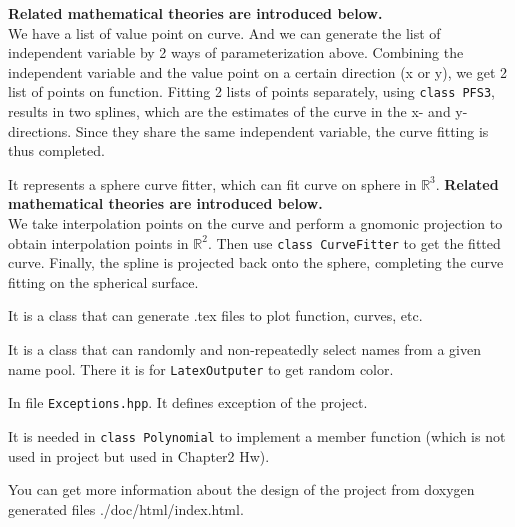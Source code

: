 \documentclass[a4paper]{article}
\begin{document}
\begin{description}
  \textbf{Related mathematical theories are introduced below.}\\
  We have a list of value point on curve. And we can generate the list of independent variable by 2 ways of parameterization above.
  Combining the independent variable and the value point on a certain direction (x or y), we get 2 list of points on function.
  Fitting 2 lists of points separately, using \texttt{class PFS3}, results in two splines, which are the estimates of the curve in the x- and y-directions. 
  Since they share the same independent variable, the curve fitting is thus completed.
  \item[SphereCurveFitter]
  It represents a sphere curve fitter, which can fit curve on sphere in \(\mathbb{R}^3\). \textbf{Related mathematical theories are introduced below.}\\
  We take interpolation points on the curve and perform a gnomonic projection to obtain interpolation points in $\mathbb{R}^2$. 
  Then use \texttt{class CurveFitter} to get the fitted curve. Finally, the spline is projected back onto the sphere, completing the curve fitting on the spherical surface.
  \item[LatexOutputer]
  It is a class that can generate .tex files to plot function, curves, etc.
  \item[NameLibrary]
  It is a class that can randomly and non-repeatedly select names from a given name pool. There it is for \texttt{LatexOutputer} to get random color.
  \item[...Exception]
  In file \texttt{Exceptions.hpp}. It defines exception of the project.
  \item[EquationSolver]
  It is needed in \texttt{class Polynomial} to implement a member function (which is not used in project but used in Chapter2 Hw).
\end{description}

You can get more information about the design of the project from doxygen generated files ./doc/html/index.html.

\printbibliography
\end{document}
